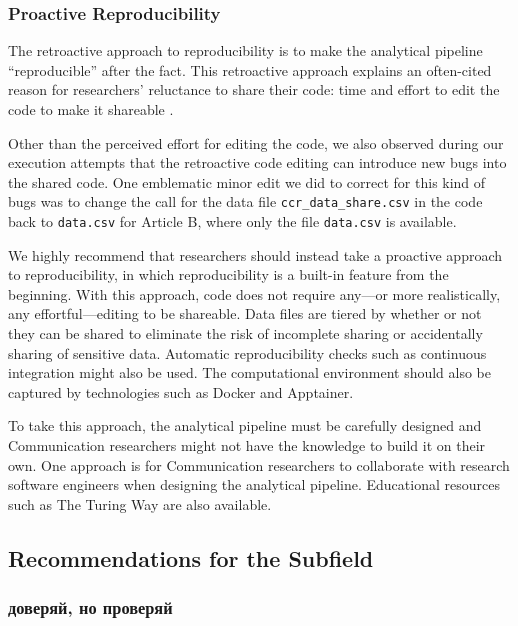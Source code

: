 \subsubsection{Proactive Reproducibility}

The retroactive approach to reproducibility is to make the analytical pipeline ``reproducible'' after the fact. This retroactive approach explains an often-cited reason for researchers' reluctance to share their code: time and effort to edit the code to make it shareable \parencite[]{ch-srcscrpainp-22}.

Other than the perceived effort for editing the code, we also observed during our execution attempts that the retroactive code editing can introduce new bugs into the shared code. One emblematic minor edit we did to correct for this kind of bugs was to change the call for the data file \texttt{ccr\_data\_share.csv} in the code back to \texttt{data.csv} for Article B, where only the file \texttt{data.csv} is available.

We highly recommend that researchers should instead take a proactive approach to reproducibility, in which reproducibility is a built-in feature from the beginning. With this approach, code does not require any---or more realistically, any effortful---editing to be shareable. Data files are tiered by whether or not they can be shared to eliminate the risk of incomplete sharing or accidentally sharing of sensitive data. Automatic reproducibility checks such as continuous integration might also be used. The computational environment should also be captured by technologies such as Docker and Apptainer.

To take this approach, the analytical pipeline must be carefully designed and Communication researchers might not have the knowledge to build it on their own. One approach is for Communication researchers to collaborate with research software engineers when designing the analytical pipeline. Educational resources such as The Turing Way \parencite[]{The_Turing_Way:2022} are also available.

\subsection{Recommendations for the Subfield}
\label{subsec:recssubfield}

\subsubsection{доверяй, но проверяй}

